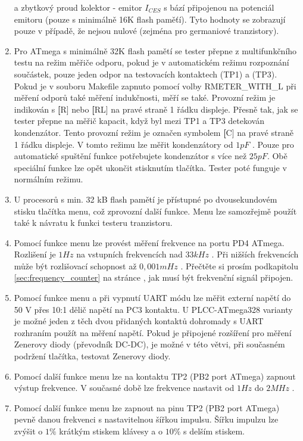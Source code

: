 \begin{enumerate}
a zbytkový proud kolektor - emitor  \(I_{CES}\) s bází připojenou na potenciál emitoru (pouze s minimálně 16K flash paměťí).
Tyto hodnoty se zobrazují pouze v případě, že nejsou nulové (zejména pro germaniové tranzistory).
\item Pro ATmega s minimálně 32K flash pamětí se tester přepne z multifunkčního testu na režim
měřiče odporu, pokud je v automatickém režimu rozpoznání součástek, pouze jeden odpor na testovacích kontaktech (TP1) a (TP3).
Pokud je v souboru Makefile zapnuto pomocí volby RMETER\_WITH\_L při měření odporů také měření indukčnosti, měří se také.
Provozní režim je indikován s {\textbf[R]} nebo {\textbf[RL]} na pravé straně 1 řádku displeje.
Přesně tak, jak se tester přepne na měřič kapacit, když byl mezi TP1 a TP3 detekován kondenzátor.
Tento provozní režim je označen symbolem {\textbf[C]} na pravé straně 1 řádku displeje.
V tomto režimu lze měřit kondenzátory  od \(1pF\) . Pouze pro automatické spuštění funkce
potřebujete kondenzátor s více než \(25pF\).
Obě speciální funkce lze opět ukončit stisknutím tlačítka. Tester poté funguje v normálním režimu.
\item U procesorů s min. 32 kB flash pamětí je přístupné po dvousekundovém stisku tlačítka menu,
což zprovozní další funkce. Menu lze samozřejmě použít také k návratu k funkci testeru tranzistoru.
\item Pomocí funkce menu lze provést měření frekvence na portu PD4 ATmega.
Rozlišení je  \(1Hz\) na vstupních frekvencích nad \(33kHz\) .
Při nižších frekvencích může být rozlišovací schopnost až \(0,001mHz\) .
Přečtěte si prosím podkapitolu \ref{sec:frequency_counter} na stránce \pageref{sec:frequency_counter},
jak musí být frekvenční signál připojen.
\item Pomocí funkce menu a při vypnutí UART módu lze měřit externí napětí do 50 V přes 10:1 dělič napětí na PC3 kontaktu.
U PLCC-ATmega328 varianty je možné jeden z těch dvou přidaných kontaktů dohromady s UART rozhraním použít na měření napětí.
Pokud je připojené rozšíření pro měření Zenerovy diody (převodník DC-DC), je možné v této větvi,
při současném podržení tlačítka, testovat Zenerovy diody.
\item Pomocí další funkce menu lze na kontaktu TP2 (PB2 port ATmega) zapnout výstup frekvence.
V současné době lze frekvence nastavit od \(1Hz\) do \(2MHz\) .
\item Pomocí další funkce menu lze zapnout na pinu TP2 (PB2 port ATmega) pevně danou frekvenci s nastavitelnou šířkou impulsu.
Šířku impulzu lze zvýšit o \(1\%\) krátkým stiskem klávesy a o \(10\%\) s delším stiskem.

\end{enumerate}
